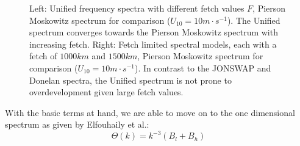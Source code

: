 \begin{figure}
\caption{Left: Unified frequency spectra with different fetch values $F$, 
Pierson Moskowitz spectrum for comparison ($U_{10} = 10m\cdot s^{-1}$).
The Unified spectrum converges towards the Pierson Moskowitz spectrum with
increasing fetch. Right: Fetch limited spectral models, each with a fetch of
$1000km$ and $1500km$, Pierson Moskowitz spectrum for comparison
($U_{10} = 10m\cdot s^{-1}$). In contrast to the JONSWAP and Donelan spectra,
the Unified spectrum is not prone to overdevelopment given large fetch values.
}
\label{fig:unified_spectra}
\end{figure}
%
With the basic terms at hand, we are able to move on to the one dimensional 
\wavenumber spectrum as given by Elfouhaily et al.:
%
\begin{equation}
 \Theta(k) = k^{-3}(B_l + B_h)
\end{equation}
